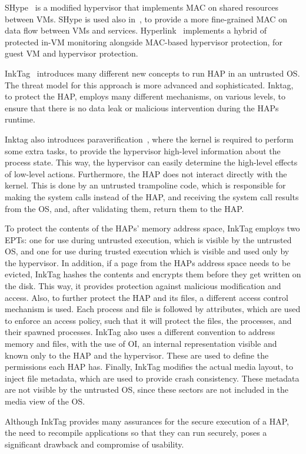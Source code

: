 \par SHype~\cite{sailer2005building} is a modified hypervisor that implements \ac{MAC} on shared resources between \ac{VM}s. SHype is used also in~\cite{hay2008forensics}, to provide a more fine-grained \ac{MAC} on data flow between \ac{VM}s and services. Hyperlink~\cite{xiao2016hyperlink} implements a hybrid of protected in-\ac{VM} monitoring alongside \ac{MAC}-based hypervisor protection, for guest \ac{VM} and hypervisor protection.

\par InkTag~\cite{hofmann2013inktag} introduces many different new concepts to run \ac{HAP} in an untrusted \ac{OS}. The threat model for this approach is more advanced and sophisticated. Inktag, to protect the \ac{HAP}, employs many different mechanisms, on various levels, to ensure that there is no data leak or malicious intervention during the \ac{HAP}s runtime. 

\par Inktag also introduces paraverification~\cite{hofmann2013inktag}, where the kernel is required to perform some extra tasks, to provide the hypervisor high-level information about the process state. This way, the hypervisor can easily determine the high-level effects of low-level actions. Furthermore, the \ac{HAP} does not interact directly with the kernel. This is done by an untrusted trampoline code, which is responsible for making the system calls instead of the \ac{HAP}, and receiving the system call results from the \ac{OS}, and, after validating them, return them to the \ac{HAP}.

\par To protect the contents of the \ac{HAP}s' memory address space, InkTag employs two \ac{EPT}s: one for use during untrusted execution, which is visible by the untrusted \ac{OS}, and one for use during trusted execution which is visible and used only by the hypervisor. In addition, if a page from the \ac{HAP}s address space needs to be evicted, InkTag hashes the contents and encrypts them before they get written on the disk. This way, it provides protection against malicious modification and access.
Also, to further protect the \ac{HAP} and its files, a different access control mechanism is used. Each process and file is followed by attributes, which are used to enforce an access policy, such that it will protect the files, the processes, and their spawned processes. InkTag also uses a different convention to address memory and files, with the use of \ac{OI}, an internal representation visible and known only to the \ac{HAP} and the hypervisor. These are used to define the permissions each \ac{HAP} has.
Finally, InkTag modifies the actual media layout, to inject file metadata, which are used to provide crash consistency. These metadata are not visible by the untrusted \ac{OS}, since these sectors are not included in the media view of the \ac{OS}. 
\par Although InkTag provides many assurances for the secure execution of a \ac{HAP}, the need to recompile applications so that they can run securely, poses a significant drawback and compromise of usability.

